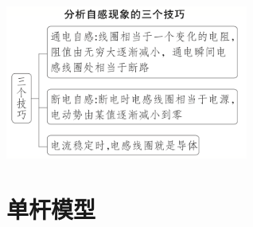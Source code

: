 \documentclass{article}
\begin{document}
\vspace{2em}

\begin{center}
    \includegraphics[width = 0.6\textwidth]{pictures/3.png}
\end{center}

\vspace{2em}

\section{单杆模型}
\end{document}
